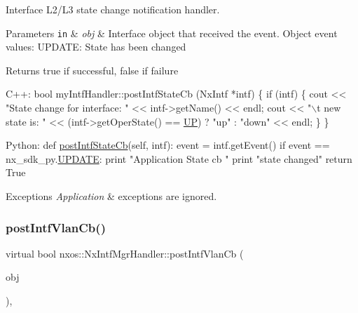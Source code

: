 Interface L2/\+L3 state change notification handler. 
\begin{DoxyParams}[1]{Parameters}
\mbox{\tt in}  & {\em obj} & Interface object that received the event. Object event values\+: U\+P\+D\+A\+TE\+: State has been changed\\
\hline
\end{DoxyParams}
\begin{DoxyReturn}{Returns}
true if successful, false if failure
\end{DoxyReturn}

\begin{DoxyCode}
C++:
    \textcolor{keywordtype}{bool}
    myIntfHandler::postIntfStateCb (NxIntf *intf)
    \{
       \textcolor{keywordflow}{if} (intf) \{
          cout << \textcolor{stringliteral}{"State change for interface: "} << 
                   intf->getName() << endl;
          cout << \textcolor{stringliteral}{"\(\backslash\)t new state is: "} << (intf->getOperState() == 
                      \mbox{\hyperlink{nx__common_8h_a7c257059d03188765435b36e95dbb764a7f57fa197f0e274e5c5d10c64d0f9436}{UP}}) ? \textcolor{stringliteral}{"up"} : \textcolor{stringliteral}{"down"} << endl;
       \}
    \}

Python:   
    def \mbox{\hyperlink{classnxos_1_1_nx_intf_mgr_handler_a9c3d4d357b1f0ab07558b4611c693755}{postIntfStateCb}}(\textcolor{keyword}{self}, intf):
        event = intf.getEvent()
        if event == nx\_sdk\_py.\mbox{\hyperlink{nx__common_8h_af9a9040b7681199d386e94eb888018cba4f3a5ababd9a5356d642a492f5ccc371}{UPDATE}}:
            print \textcolor{stringliteral}{"Application State cb "}
            print \textcolor{stringliteral}{"state changed"}
        return True
\end{DoxyCode}



\begin{DoxyExceptions}{Exceptions}
{\em Application} & exceptions are ignored. \\
\hline
\end{DoxyExceptions}
\mbox{\label{classnxos_1_1_nx_intf_mgr_handler_aad14cab2e803ceadef82870303db526c}} 
\subsubsection{\texorpdfstring{post\+Intf\+Vlan\+Cb()}{postIntfVlanCb()}}
{\footnotesize\ttfamily virtual bool nxos\+::\+Nx\+Intf\+Mgr\+Handler\+::post\+Intf\+Vlan\+Cb (\begin{DoxyParamCaption}\item[{\mbox{\hyperlink{classnxos_1_1_nx_intf}{Nx\+Intf}} $\ast$}]{obj }\end{DoxyParamCaption})\hspace{0.3cm}{\ttfamily [inline]}, {\ttfamily [virtual]}}

